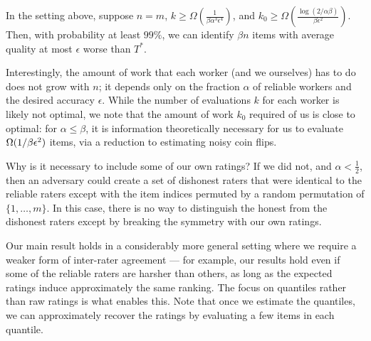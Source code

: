 \begin{theorem}
\label{thm:intro}
In the setting above, suppose $n = m$, 
$k \geq \Omega(\tfrac{1}{\beta\alpha^3\epsilon^4})$, and 
$k_0 \geq \Omega(\tfrac{\log(2/\alpha\beta)}{\beta\epsilon^2})$. Then, with probability 
at least $99\%$, we can identify $\beta n$ items with average quality at most 
$\epsilon$ worse than $T^*$.
\end{theorem}
Interestingly, the amount of work that each worker (and we ourselves) has 
to do does not grow with $n$; it depends only on the fraction $\alpha$ of 
reliable workers and the desired accuracy $\epsilon$. While the number 
of evaluations $k$ for each worker is likely not optimal, we note that 
the amount of work $k_0$ required of us is close to optimal: 
for $\alpha \le \beta$, it is information theoretically necessary for 
us to evaluate $\Omega(1/\beta\epsilon^2)$ items, via a reduction to estimating 
noisy coin flips. %

Why is it necessary to include some of our own ratings? 
If we did not, and $\alpha < \frac{1}{2}$, then an adversary could create a set of 
dishonest raters that were identical to the reliable raters except with the 
item indices permuted by a random permutation of $\{1,\ldots,m\}$. In this case, 
there is no way to distinguish the honest from the dishonest raters except by 
breaking the symmetry with our own ratings.

Our main result holds in a considerably more general setting where we require a 
weaker form of inter-rater agreement --- for example, our results hold even if 
some of the reliable raters are harsher than others, as long as 
the expected ratings induce approximately the same ranking.
The focus on quantiles rather than raw ratings is what enables this. 
Note that once we estimate the quantiles, we can approximately recover the 
ratings by evaluating a few items in each quantile.

